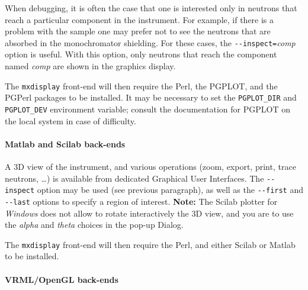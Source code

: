 When debugging, it is often the case that one is interested only in
neutrons that reach a particular component in the instrument. For
example, if there is a problem with the sample one may prefer not to see
the neutrons that are absorbed in the monochromator shielding. For these
cases, the \verb+--inspect=+\textit{comp\/} option is useful. With this
option, only neutrons that reach the component named \textit{comp\/} are
shown in the graphics display.


The \verb+mxdisplay+ front-end will then require the Perl, the PGPLOT, and the
PGPerl packages to be installed. It may be necessary to set the
\verb+PGPLOT_DIR+ and \verb+PGPLOT_DEV+ environment variable; consult the
documentation for PGPLOT on the local system in case of difficulty.
  

\paragraph{Matlab and Scilab back-ends}

A 3D view of the instrument, and various operations (zoom, export, print, trace neutrons, \ldots) is available from dedicated Graphical User Interfaces.
The \verb+--inspect+ option may be used (see previous paragraph), as well as the \verb+--first+ and \verb+--last+ options to specify a region of interest. {\bf Note:} The Scilab plotter for \emph{Windows} does not allow to rotate interactively the 3D view, and you are to use the \emph{alpha} and \emph{theta} choices in the pop-up Dialog.

The \verb+mxdisplay+ front-end will then
require the Perl, and either Scilab or Matlab to be installed.  

\paragraph{VRML/OpenGL back-ends}

